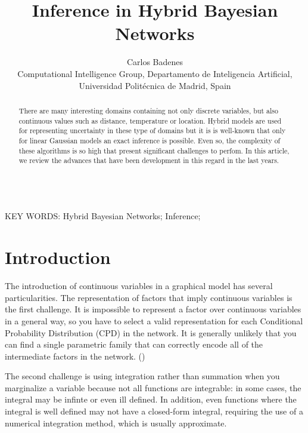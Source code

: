 \documentclass[a4paper,11pt]{article}
\begin{document}
\title{Inference in Hybrid Bayesian Networks}

\author{{Carlos Badenes}\\
{\small Computational Intelligence Group, Departamento de Inteligencia Artificial, Universidad Polit\'ecnica de Madrid, Spain}}

\date{}
\maketitle



\begin{abstract} There are many interesting domains containing not only discrete variables, but also continuous values such as distance, temperature or location. Hybrid models are used for representing uncertainty in these type of domains but it is is well-known that only for linear Gaussian models an exact inference is possible. Even so, the complexity of these algorithms is so high that present significant challenges to perfom. In this article, we review the advances that have been development in this regard in the last years.
\end{abstract}


\ \\
KEY WORDS: Hybrid Bayesian Networks; Inference;




\section{Introduction}

The introduction of continuous variables in a graphical model has several particularities. The representation of factors that imply continuous variables is the first challenge. It is impossible to represent a factor over continuous variables in a general way, so you have to select a valid representation for each Conditional Probability Distribution (CPD) in the network. It is generally unlikely that you can find a single parametric family that can correctly encode all of the intermediate factors in the network. (\cite{probabilisticModel2009})

The second challenge is using integration rather than summation when you marginalize a variable because not all functions are integrable: in some cases, the integral may be infinte or even ill defined. In addition, even functions where the integral is well defined may not have a closed-form integral, requiring the use of a numerical integration method, which is usually approximate.
\end{document}
